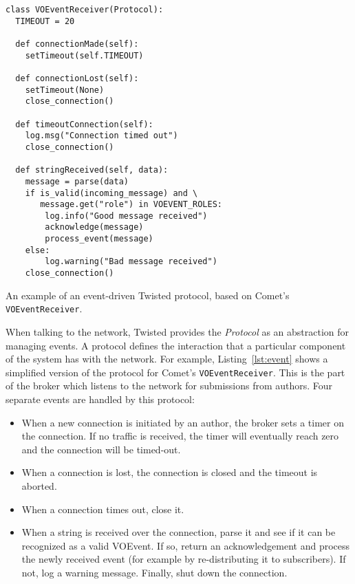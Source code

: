 \documentclass[5p,authoryear]{elsarticle}
\begin{document}
\begin{listing}[t]
\begin{verbatim}
class VOEventReceiver(Protocol):
  TIMEOUT = 20

  def connectionMade(self):
    setTimeout(self.TIMEOUT)

  def connectionLost(self):
    setTimeout(None)
    close_connection()

  def timeoutConnection(self):
    log.msg("Connection timed out")
    close_connection()

  def stringReceived(self, data):
    message = parse(data)
    if is_valid(incoming_message) and \
       message.get("role") in VOEVENT_ROLES:
        log.info("Good message received")
        acknowledge(message)
        process_event(message)
    else:
        log.warning("Bad message received")
    close_connection()
\end{verbatim}
\caption{An example of an event-driven Twisted protocol, based on Comet's
\texttt{VOEventReceiver}.}
\label{lst:event}
\end{listing}


When talking to the network, Twisted provides the \textit{Protocol} as an
abstraction for managing events. A protocol defines the interaction that a
particular component of the system has with the network. For example,
Listing~\ref{lst:event} shows a simplified version of the protocol for Comet's
\texttt{VOEventReceiver}. This is the part of the broker which listens to the
network for submissions from authors. Four separate events are handled by this
protocol:

\begin{itemize}

\item{When a new connection is initiated by an author, the broker sets a
timer on the connection. If no traffic is received, the timer will eventually
reach zero and the connection will be timed-out.}

\item{When a connection is lost, the connection is closed and the timeout is
aborted.}

\item{When a connection times out, close it.}

\item{When a string is received over the connection, parse it and see if it
can be recognized as a valid VOEvent. If so, return an acknowledgement and
process the newly received event (for example by re-distributing it to
subscribers). If not, log a warning message. Finally, shut down the
connection.}

\end{itemize}
\end{document}
